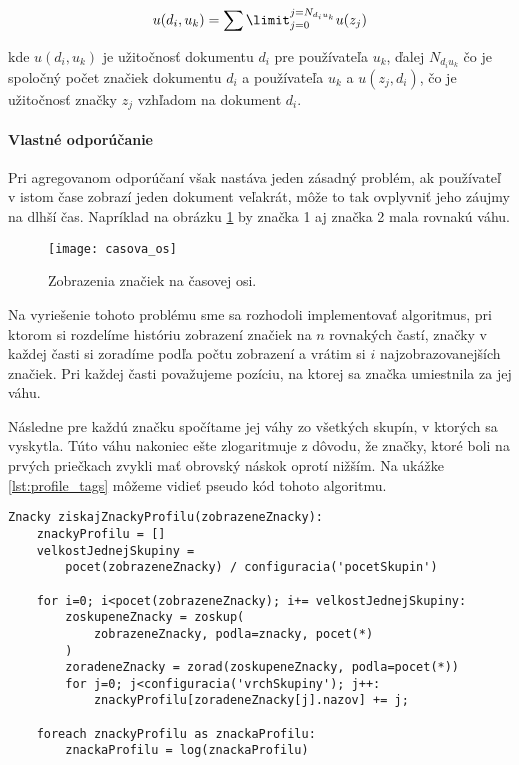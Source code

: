 \begin{equation}\label{eq:aggregated_recommendation}
u(d_i, u_k) = \sum\limit_{j = 0}^{j = N_{d_i u_k}} u(z_j)
\end{equation}

kde \(u(d_i, u_k)\) je užitočnosť dokumentu \(d_i\) pre používateľa \(u_k\),
ďalej \(N_{d_i u_k}\) čo je spoločný počet značiek dokumentu \(d_i\) a používateľa
\(u_k\) a \(u(z_j, d_i)\), čo je užitočnosť značky \(z_j\) vzhľadom na dokument 
\(d_i\).

\paragraph{Vlastné odporúčanie}

Pri agregovanom odporúčaní však nastáva jeden zásadný problém, 
ak používateľ v istom čase zobrazí jeden dokument veľakrát, môže to tak ovplyvniť 
jeho záujmy na dlhší čas. Napríklad na obrázku \ref{fig:casova_os} by značka 1 aj
značka 2 mala rovnakú váhu.

\begin{figure}
    \begin{center}
        \texttt{[image: casova\_os]}
        \caption{Zobrazenia značiek na časovej osi.}
        \label{fig:casova_os}
    \end{center}
\end{figure}

Na vyriešenie tohoto problému sme sa rozhodoli implementovať algoritmus, pri ktorom si 
rozdelíme históriu zobrazení značiek na \(n\) rovnakých častí, značky v každej časti 
si zoradíme podľa počtu zobrazení a vrátim si \(i\) najzobrazovanejších značiek. 
Pri každej časti považujeme pozíciu, na ktorej sa značka umiestnila za jej váhu.

Následne pre každú značku spočítame jej váhy zo všetkých skupín, v ktorých sa vyskytla. 
Túto váhu nakoniec ešte zlogaritmuje z dôvodu, že značky, ktoré boli na prvých priečkach 
zvykli mať obrovský náskok oprotí nižším. Na ukážke \ref{lst:profile_tags} môžeme
vidieť pseudo kód tohoto algoritmu.

\begin{lstlisting}[label=lst:profile_tags, caption=Získanie značiek profilu]
Znacky ziskajZnackyProfilu(zobrazeneZnacky):
    znackyProfilu = []
    velkostJednejSkupiny = 
        pocet(zobrazeneZnacky) / configuracia('pocetSkupin')

    for i=0; i<pocet(zobrazeneZnacky); i+= velkostJednejSkupiny:
        zoskupeneZnacky = zoskup(
            zobrazeneZnacky, podla=znacky, pocet(*)
        )
        zoradeneZnacky = zorad(zoskupeneZnacky, podla=pocet(*))
        for j=0; j<configuracia('vrchSkupiny'); j++:
            znackyProfilu[zoradeneZnacky[j].nazov] += j;
    
    foreach znackyProfilu as znackaProfilu:
        znackaProfilu = log(znackaProfilu)
\end{lstlisting}

